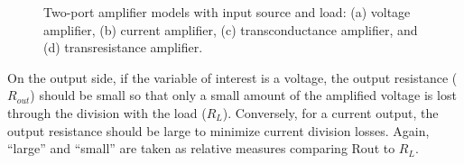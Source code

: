 \documentclass[
  11pt,
  letterpaper,
  abstract]{scrbook}
\begin{document}
\begin{figure}


\caption{\label{fig-1.9}Two-port amplifier models with input source and
load: (a) voltage amplifier, (b) current amplifier, (c) transconductance
amplifier, and (d) transresistance amplifier.}

\end{figure}%

On the output side, if the variable of interest is a voltage, the output
resistance (\(R_{out}\)) should be small so that only a small amount of
the amplified voltage is lost through the division with the load
(\(R_L\)). Conversely, for a current output, the output resistance
should be large to minimize current division losses. Again, ``large''
and ``small'' are taken as relative measures comparing Rout to \(R_L\).
\end{document}
